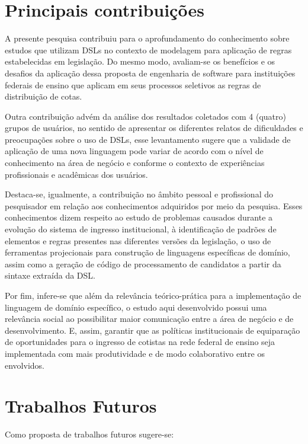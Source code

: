 \section{Principais contribuições}
\label{principaiscontribuicoes}

A presente pesquisa contribuiu para o aprofundamento do conhecimento sobre estudos que utilizam \gls{DSL}s no contexto de modelagem para aplicação de regras estabelecidas em legislação. Do mesmo modo, avaliam-se os benefícios e os desafios da aplicação dessa proposta de engenharia de software para instituições federais de ensino que aplicam em seus processos seletivos as regras de distribuição de cotas. 

Outra contribuição advém da análise dos resultados coletados com 4 (quatro) grupos de usuários, no sentido de apresentar os diferentes relatos de dificuldades e preocupações sobre o uso de DSLs, esse levantamento sugere que a validade de aplicação de uma nova linguagem pode variar de acordo com o nível de conhecimento na área de negócio e conforme o contexto de experiências profissionais e acadêmicas dos usuários.

Destaca-se, igualmente, a contribuição no âmbito pessoal e profissional do pesquisador em relação aos conhecimentos adquiridos por meio da pesquisa. Esses conhecimentos dizem respeito ao estudo de problemas causados durante a evolução do sistema de ingresso institucional, à identificação de padrões de elementos e regras presentes nas diferentes versões da legislação, o uso de ferramentas projecionais para construção de linguagens específicas de domínio, assim como a geração de código de processamento de candidatos a partir da sintaxe extraída da DSL.

Por fim, infere-se que além da relevância teórico-prática para a implementação de linguagem de domínio específico, o estudo aqui desenvolvido possui uma relevância social ao possibilitar maior comunicação entre a área de negócio e de desenvolvimento. E, assim, garantir que as políticas institucionais de equiparação de oportunidades para o ingresso de cotistas na rede federal de ensino seja implementada com mais produtividade e de modo colaborativo entre os envolvidos.   

\section{Trabalhos Futuros}
\label{trabalhosfuturos}

Como proposta de trabalhos futuros sugere-se:


